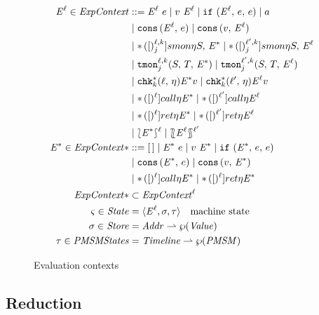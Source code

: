 \documentclass[preprint,onecolumn,9pt]{sigplanconf} %
\begin{document}
\begin{figure}
\begin{align*}
\mctx{\mmlab} \in \ECtx &::=
      \sapp{\mctx{\mmlab}}{\mexp}
 \alt \sapp{\mval}{\mctx{\mmlab}}
 \alt \sif{\mctx{\mmlab}}{\mexp}{\mexp}
 \alt \maddr \\
&\alt \vcons{\mctx{\mmlab}}{\mexp}
 \alt \vcons{\mval}{\mctx{\mmlab}} \\
&\alt \sSMon{\ell}{k}{j}{\mtimeline}{\mscon}{\mctx*}
 \alt \sSMon{\ell^\prime}{k}{j}{\mtimeline}{\mscon}{\mctx{\ell}} \\
&\alt \sTMon{\ell}{k}{j}{\mscon}{\mtcon}{\mctx*}
 \alt \sTMon{\ell^\prime}{k}{j}{\mscon}{\mtcon}{\mctx{\ell}} \\
&\alt \schk*{k}{\ell}{\mtimeline}{\mctx*}{\mval}
 \alt \schk*{k}{\ell^\prime}{\mtimeline}{\mctx{\ell}}{\mval} \\
&\alt \scall{\ell}{\mtimeline}{\mctx*}
 \alt \scall{\ell^\prime}{\mtimeline}{\mctx{\ell}} \\
&\alt \sret{\ell}{\mtimeline}{\mctx*}
 \alt \sret{\ell^\prime}{\mtimeline}{\mctx{\ell}} \\
&\alt \sown{\mctx*}{\ell}
 \alt \sOwn{\mctx{\ell}}{\ell^\prime}
\\
\mctx* \in \ECtx* &::=
      \hole
 \alt \sapp{\mctx*}{\mexp}
 \alt \sapp{\mval}{\mctx*}
 \alt \sif{\mctx*}{\mexp}{\mexp} \\
&\alt \vcons{\mctx*}{\mexp}
 \alt \vcons{\mval}{\mctx*} \\
&\alt \scall{\mmlab}{\mtimeline}{\mctx*}
 \alt \sret{\mmlab}{\mtimeline}{\mctx*} \\
\ECtx* &\subset \ECtx^\mmlab
\\
\mstate \in \State &= \angle{\mctx{\mmlab}, \msto, \mTMons} \quad\text{machine state}
\\
\msto \in \Store &= \Addr \parto \wp(\Value)
\\
\mTMons \in \TMons &= \Timeline \parto \wp(\PMSM)
\end{align*}
\caption{Evaluation contexts}
\label{fig:ctx}
\end{figure}

\subsection{Reduction}
\end{document}
